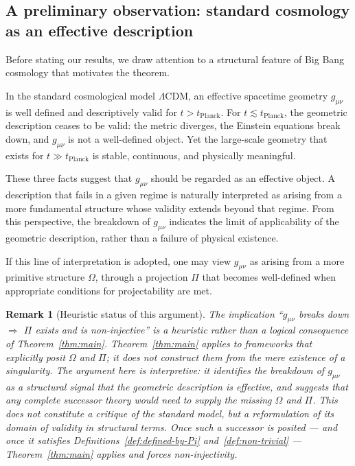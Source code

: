 \documentclass[12pt,a4paper]{article}
\newtheorem{remark}{Remark}
\begin{document}
  \subsection*{A preliminary observation: standard cosmology as an effective description}

    Before stating our results, we draw attention to a structural feature of
    Big Bang cosmology that motivates the theorem.

    In the standard cosmological model $\Lambda$CDM, an effective spacetime
    geometry $g_{\mu\nu}$ is well defined and descriptively valid for
    $t > t_\mathrm{Planck}$.
    For $t \lesssim t_\mathrm{Planck}$, the geometric description ceases to be
    valid: the metric diverges, the Einstein equations break down, and
    $g_{\mu\nu}$ is not a well-defined object.
    Yet the large-scale geometry that exists for $t \gg t_\mathrm{Planck}$ is
    stable, continuous, and physically meaningful.

    These three facts suggest that $g_{\mu\nu}$ should be regarded as an
    effective object.
    A description that fails in a given regime is naturally interpreted as
    arising from a more fundamental structure whose validity extends beyond
    that regime.
    From this perspective, the breakdown of $g_{\mu\nu}$ indicates the limit of
    applicability of the geometric description, rather than a failure of
    physical existence.

    If this line of interpretation is adopted, one may view $g_{\mu\nu}$ as
    arising from a more primitive structure $\Omega$, through a projection
    $\Pi$ that becomes well-defined when appropriate conditions for
    projectability are met.

    \begin{remark}[Heuristic status of this argument]
      \label{rem:lcdm-heuristic}
      The implication ``$g_{\mu\nu}$ breaks down $\Rightarrow$ $\Pi$ exists and
      is non-injective'' is a heuristic rather than a logical consequence of
      Theorem~\ref{thm:main}.
      Theorem~\ref{thm:main} applies to frameworks that explicitly posit $\Omega$
      and $\Pi$; it does not construct them from the mere existence of a
      singularity.
      The argument here is interpretive: it identifies the breakdown of
      $g_{\mu\nu}$ as a structural signal that the geometric description is
      effective, and suggests that any complete successor theory would need to
      supply the missing $\Omega$ and $\Pi$.
      This does not constitute a critique of the standard model, but a
      reformulation of its domain of validity in structural terms.
      Once such a successor is posited --- and once it satisfies
      Definitions~\ref{def:defined-by-Pi} and~\ref{def:non-trivial} ---
      Theorem~\ref{thm:main} applies and forces non-injectivity.
    \end{remark}
\end{document}
